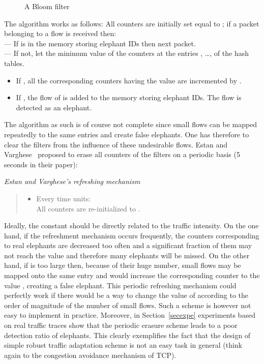 \documentclass{amsart}
\begin{document}
\begin{figure}[htbp]
\caption{A Bloom filter \label{filter}}
\end{figure}
The algorithm works as follows: All counters are initially set equal to ;  if a packet belonging to a flow  is received then:\\
\noindent
--- If  is in the memory storing elephant IDs then next packet.\\
\noindent
--- If not, let  the minimum  value of the counters at the entries ,
  \ldots,  of the  hash tables. 
\begin{itemize}
\item  If , all the corresponding counters having the value  are incremented  by .
\item  If  , the flow of  is added to the memory storing elephant IDs. The
  flow is detected as  an elephant.  
\end{itemize}
The algorithm as such is of course not complete since  small flows can be mapped repeatedly
to the same entries and create false elephants. One has therefore to clear the filters
from the influence of these undesirable flows. Estan  and Varghese~\cite{Varghese}
proposed to erase all counters of the filters on a periodic basis (5 seconds in their
paper):

\bigskip
\noindent
{\em Estan and Varghese's refreshing mechanism}
\begin{quote}
\begin{itemize}
\item  Every  time units:\\
All counters are re-initialized to . 
\end{itemize}
\end{quote}
Ideally, the constant  should be directly related to the traffic
intensity.  On the  one hand, if
the refreshment mechanism occurs frequently, the counters corresponding to real elephants
are decreased too often and a significant fraction of them may not reach the
value  and therefore many elephants will be missed. On the other hand, if  is too large then,
because of their huge number, small flows may be mapped onto the same
entry and would increase the corresponding counter to the value , creating a false
elephant. This periodic refreshing mechanism could perfectly work if there would be a way to change the
value of  according to the order of magnitude of the number of small flows. Such a
scheme is however not easy to implement in practice. Moreover, in  Section~\ref{secexpe} experiments based on real traffic traces show that the periodic erasure scheme leads to a poor detection ratio of elephants.  This clearly exemplifies the fact that   the design of simple robust traffic adaptation scheme is not
an easy task in general (think again to the congestion avoidance mechanism of TCP). 
\end{document}
